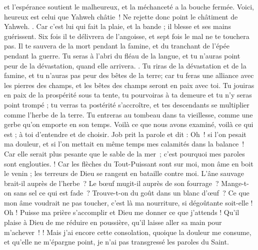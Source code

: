 \begin{multicols}{2}
et l'espérance soutient le malheureux, et la méchanceté a la bouche fermée.
Voici, heureux est celui que Yahweh châtie ! Ne rejette donc point le châtiment de Yahweh.
.
Car c'est lui qui fait la plaie, et la bande ; il blesse et ses mains guérissent.
Six fois il te délivrera de l'angoisse, et sept fois le mal ne te touchera pas.
Il te sauvera de la mort pendant la famine, et du tranchant de l'épée pendant la guerre.
Tu seras à l'abri du fléau de la langue, et tu n’auras point peur de la dévastation, quand elle arrivera.
.
Tu riras de la dévastation et de la famine, et tu n'auras pas peur des bêtes de la terre;
car tu feras une alliance avec les pierres des champs, et les bêtes des champs seront en paix avec toi.
Tu jouiras en paix de la prospérité sous ta tente, tu pourvoiras à ta demeure et tu n'y seras point trompé ;
tu verras ta postérité s'accroître, et tes descendants se multiplier comme l'herbe de la terre.
Tu entreras au tombeau dans ta vieillesse, comme une gerbe qu'on emporte en son temps.
Voilà ce que nous avons examiné, voilà ce qui est ; à toi d'entendre et de choisir.
\VerseOne{}Job prit la parole et dit :
Oh ! si l’on pesait ma douleur, et si l’on mettait en même temps mes calamités dans la balance !
Car elle serait plus pesante que le sable de la mer ; c’est pourquoi mes paroles sont englouties.
 !
Car les flèches du Tout-Puissant sont sur moi, mon âme en boit le venin ; les terreurs de Dieu se rangent en bataille contre moi.
L'âne sauvage brait-il auprès de l’herbe ? Le bœuf mugit-il auprès de son fourrage ?
Mange-t-on sans sel ce qui est fade ? Trouve-t-on du goût dans un blanc d’œuf ?
Ce que mon âme voudrait ne pas toucher, c'est là ma nourriture, si dégoûtante soit-elle !
Oh ! Puisse ma prière s'accomplir et Dieu me donner ce que j'attends !
Qu’il plaise à Dieu de me réduire en poussière, qu’il laisse aller sa main pour m’achever !
!
Mais j’ai encore cette consolation, quoique la douleur me consume, et qu’elle ne m’épargne point, je n'ai pas transgressé les paroles du Saint.

\end{multicols}
